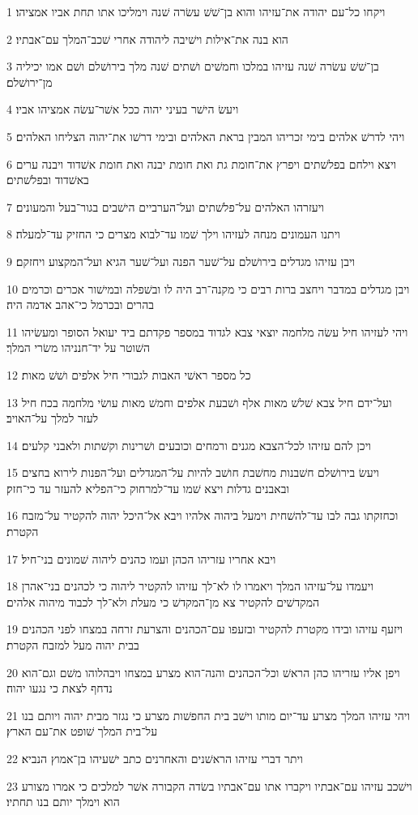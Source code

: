 \par 1 ויקחו כל־עם יהודה את־עזיהו והוא בן־שׁשׁ עשׂרה שׁנה וימליכו אתו תחת אביו אמציהו׃
\par 2 הוא בנה את־אילות וישׁיבה ליהודה אחרי שׁכב־המלך עם־אבתיו׃
\par 3 בן־שׁשׁ עשׂרה שׁנה עזיהו במלכו וחמשׁים ושׁתים שׁנה מלך בירושׁלם ושׁם אמו יכיליה מן־ירושׁלם׃
\par 4 ויעשׂ הישׁר בעיני יהוה ככל אשׁר־עשׂה אמציהו אביו׃
\par 5 ויהי לדרשׁ אלהים בימי זכריהו המבין בראת האלהים ובימי דרשׁו את־יהוה הצליחו האלהים׃
\par 6 ויצא וילחם בפלשׁתים ויפרץ את־חומת גת ואת חומת יבנה ואת חומת אשׁדוד ויבנה ערים באשׁדוד ובפלשׁתים׃
\par 7 ויעזרהו האלהים על־פלשׁתים ועל־הערביים הישׁבים בגור־בעל והמעונים׃
\par 8 ויתנו העמונים מנחה לעזיהו וילך שׁמו עד־לבוא מצרים כי החזיק עד־למעלה׃
\par 9 ויבן עזיהו מגדלים בירושׁלם על־שׁער הפנה ועל־שׁער הגיא ועל־המקצוע ויחזקם׃
\par 10 ויבן מגדלים במדבר ויחצב ברות רבים כי מקנה־רב היה לו ובשׁפלה ובמישׁור אכרים וכרמים בהרים ובכרמל כי־אהב אדמה היה׃
\par 11 ויהי לעזיהו חיל עשׂה מלחמה יוצאי צבא לגדוד במספר פקדתם ביד יעואל הסופר ומעשׂיהו השׁוטר על יד־חנניהו משׂרי המלך׃
\par 12 כל מספר ראשׁי האבות לגבורי חיל אלפים ושׁשׁ מאות׃
\par 13 ועל־ידם חיל צבא שׁלשׁ מאות אלף ושׁבעת אלפים וחמשׁ מאות עושׂי מלחמה בכח חיל לעזר למלך על־האויב׃
\par 14 ויכן להם עזיהו לכל־הצבא מגנים ורמחים וכובעים ושׁרינות וקשׁתות ולאבני קלעים׃
\par 15 ויעשׂ בירושׁלם חשׁבנות מחשׁבת חושׁב להיות על־המגדלים ועל־הפנות לירוא בחצים ובאבנים גדלות ויצא שׁמו עד־למרחוק כי־הפליא להעזר עד כי־חזק׃
\par 16 וכחזקתו גבה לבו עד־להשׁחית וימעל ביהוה אלהיו ויבא אל־היכל יהוה להקטיר על־מזבח הקטרת׃
\par 17 ויבא אחריו עזריהו הכהן ועמו כהנים ליהוה שׁמונים בני־חיל׃
\par 18 ויעמדו על־עזיהו המלך ויאמרו לו לא־לך עזיהו להקטיר ליהוה כי לכהנים בני־אהרן המקדשׁים להקטיר צא מן־המקדשׁ כי מעלת ולא־לך לכבוד מיהוה אלהים׃
\par 19 ויזעף עזיהו ובידו מקטרת להקטיר ובזעפו עם־הכהנים והצרעת זרחה במצחו לפני הכהנים בבית יהוה מעל למזבח הקטרת׃
\par 20 ויפן אליו עזריהו כהן הראשׁ וכל־הכהנים והנה־הוא מצרע במצחו ויבהלוהו משׁם וגם־הוא נדחף לצאת כי נגעו יהוה׃
\par 21 ויהי עזיהו המלך מצרע עד־יום מותו וישׁב בית החפשׁות מצרע כי נגזר מבית יהוה ויותם בנו על־בית המלך שׁופט את־עם הארץ׃
\par 22 ויתר דברי עזיהו הראשׁנים והאחרנים כתב ישׁעיהו בן־אמוץ הנביא׃
\par 23 וישׁכב עזיהו עם־אבתיו ויקברו אתו עם־אבתיו בשׂדה הקבורה אשׁר למלכים כי אמרו מצורע הוא וימלך יותם בנו תחתיו׃

